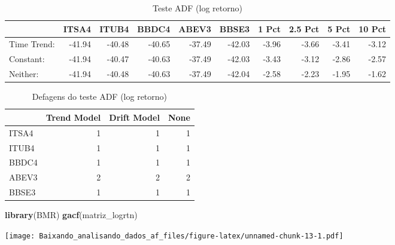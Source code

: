 \documentclass[]{article}
\newenvironment{Shaded}{\begin{snugshade}}{\end{snugshade}}
\newcommand{\KeywordTok}[1]{\textcolor[rgb]{0.13,0.29,0.53}{\textbf{{#1}}}}
\newcommand{\DataTypeTok}[1]{\textcolor[rgb]{0.13,0.29,0.53}{{#1}}}
\newcommand{\DecValTok}[1]{\textcolor[rgb]{0.00,0.00,0.81}{{#1}}}
\newcommand{\StringTok}[1]{\textcolor[rgb]{0.31,0.60,0.02}{{#1}}}
\newcommand{\OtherTok}[1]{\textcolor[rgb]{0.56,0.35,0.01}{{#1}}}
\newcommand{\NormalTok}[1]{{#1}}
\begin{document}
\begin{longtable}[t]{lrrrrrrrrr}
\caption{\label{tab:unnamed-chunk-12}Teste ADF (log retorno)}\\
\toprule
  & ITSA4 & ITUB4 & BBDC4 & ABEV3 & BBSE3 & 1 Pct & 2.5 Pct & 5 Pct & 10 Pct\\
\midrule
Time Trend: & -41.94 & -40.48 & -40.65 & -37.49 & -42.03 & -3.96 & -3.66 & -3.41 & -3.12\\
Constant: & -41.94 & -40.47 & -40.63 & -37.49 & -42.03 & -3.43 & -3.12 & -2.86 & -2.57\\
Neither: & -41.94 & -40.48 & -40.63 & -37.49 & -42.04 & -2.58 & -2.23 & -1.95 & -1.62\\
\bottomrule
\end{longtable}

\begin{Shaded}
\end{Shaded}

\begin{longtable}[t]{lrrr}
\caption{\label{tab:unnamed-chunk-12}Defagens do teste ADF (log retorno)}\\
\toprule
  & Trend Model & Drift Model & None\\
\midrule
ITSA4 & 1 & 1 & 1\\
ITUB4 & 1 & 1 & 1\\
BBDC4 & 1 & 1 & 1\\
ABEV3 & 2 & 2 & 2\\
BBSE3 & 1 & 1 & 1\\
\bottomrule
\end{longtable}

\begin{Shaded}
\begin{Highlighting}[]
\KeywordTok{library}\NormalTok{(BMR)}
\KeywordTok{gacf}\NormalTok{(matriz_logrtn)}
\end{Highlighting}
\end{Shaded}

\texttt{[image: Baixando\_analisando\_dados\_af\_files/figure-latex/unnamed-chunk-13-1.pdf]}
\end{document}
